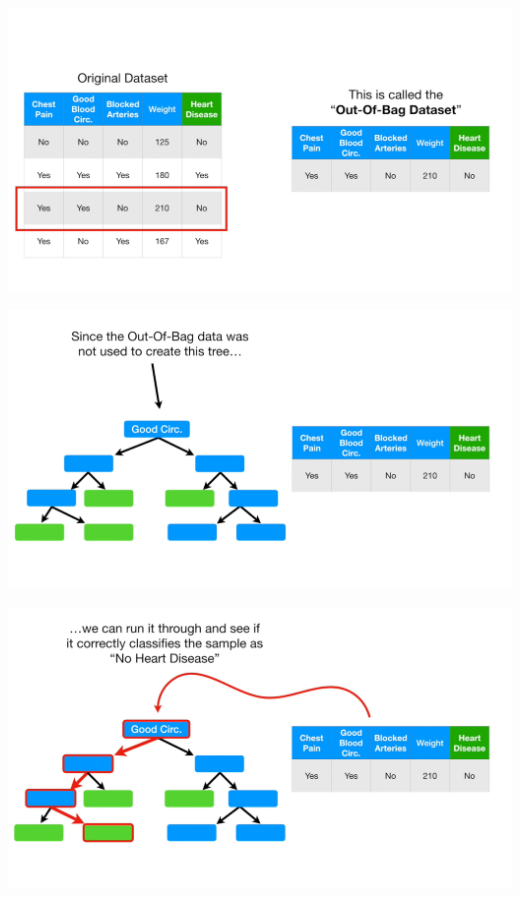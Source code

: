 \documentclass[
  ignorenonframetext,
]{beamer}
\begin{document}
\begin{frame}{}
\protect\hypertarget{section-71}{}
\includegraphics{images/r72.png}
\end{frame}

\begin{frame}{}
\protect\hypertarget{section-72}{}
\includegraphics{images/r73.png}
\end{frame}

\begin{frame}{}
\protect\hypertarget{section-73}{}
\includegraphics{images/r74.png}
\end{frame}
\end{document}
